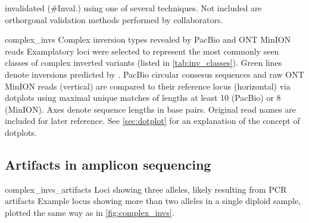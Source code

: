 \begin{table}[ht]
\begin{adjustbox}{inner,minipage=[b]{\textplusmargin}}
\begin{minipage}[t]{0.54\textplusmargin}
{                invalidated (\#Inval.) using one of several techniques.
                Not included are orthorgonal validation methods performed by
                collaborators.}
            \end{minipage}
            \hspace{0.04\textplusmargin}
            \begin{minipage}[t]{0.42\textplusmargin}
                \centering
            \end{minipage}
        \end{adjustbox}
\end{table}





    {complex_invs}
    {Complex inversion types revealed by PacBio and ONT MinION reads}
    {Examplatory loci were selected to represent the most commonly seen
    classes of complex inverted variants (listed in \cref{tab:inv_classes}).
    Green lines denote inversions predicted by \delly. PacBio circular
    consesus sequences and raw ONT MinION reads (vertical) are compared to their
    reference locus (horizontal) via dotplots using maximal unique matches
    of lengths at least 10 (PacBio) or 8 (MinION). Axes denote sequence lengths
    in base pairs. Original read names are included for later reference. See
    \cref{sec:dotplot} for an explanation of the concept of dotplots.}


\subsection{Artifacts in amplicon sequencing}
\label{sec:complex_invs_artifacts}


    {complex_invs_artifacts}
    {Loci showing three alleles, likely resulting from PCR artifacts}
    {Example locus showing more than two alleles in a single diploid sample,
    plotted the same way as in \cref{fig:complex_invs}.}



